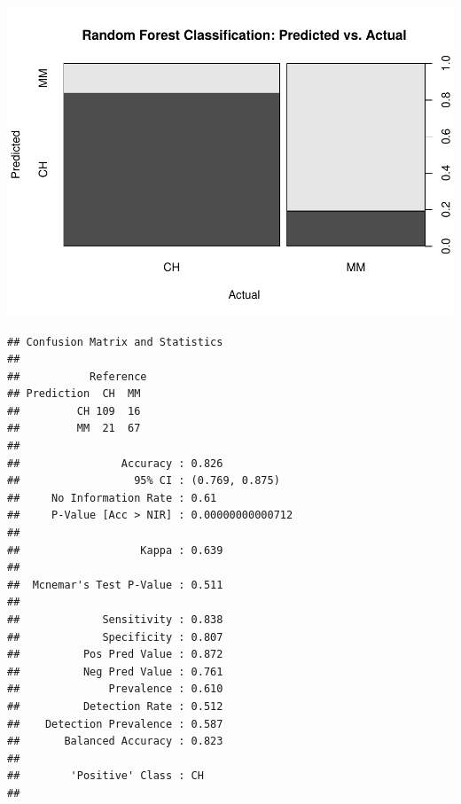 \documentclass[
]{book}
\newenvironment{Shaded}{\begin{snugshade}}{\end{snugshade}}
\newcommand{\DataTypeTok}[1]{\textcolor[rgb]{0.13,0.29,0.53}{#1}}
\newcommand{\KeywordTok}[1]{\textcolor[rgb]{0.13,0.29,0.53}{\textbf{#1}}}
\newcommand{\NormalTok}[1]{#1}
\newcommand{\OperatorTok}[1]{\textcolor[rgb]{0.81,0.36,0.00}{\textbf{#1}}}
\newcommand{\StringTok}[1]{\textcolor[rgb]{0.31,0.60,0.02}{#1}}
\begin{document}
\includegraphics{data-sci_files/figure-latex/unnamed-chunk-115-2.pdf}

\begin{Shaded}
\end{Shaded}

\begin{verbatim}
## Confusion Matrix and Statistics
## 
##           Reference
## Prediction  CH  MM
##         CH 109  16
##         MM  21  67
##                                           
##                Accuracy : 0.826           
##                  95% CI : (0.769, 0.875)  
##     No Information Rate : 0.61            
##     P-Value [Acc > NIR] : 0.00000000000712
##                                           
##                   Kappa : 0.639           
##                                           
##  Mcnemar's Test P-Value : 0.511           
##                                           
##             Sensitivity : 0.838           
##             Specificity : 0.807           
##          Pos Pred Value : 0.872           
##          Neg Pred Value : 0.761           
##              Prevalence : 0.610           
##          Detection Rate : 0.512           
##    Detection Prevalence : 0.587           
##       Balanced Accuracy : 0.823           
##                                           
##        'Positive' Class : CH              
## 
\end{verbatim}
\end{document}
